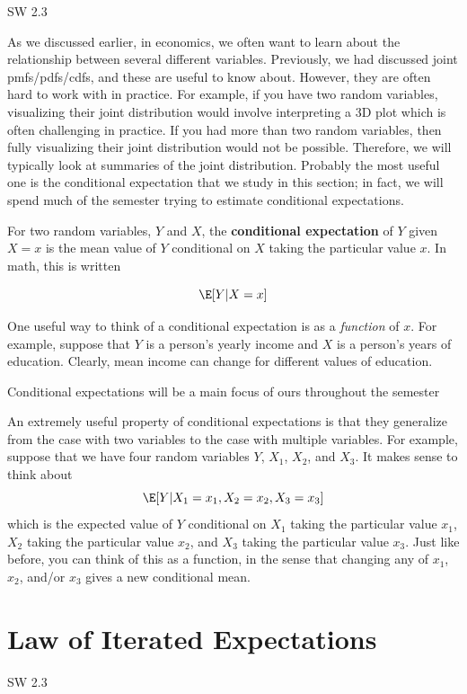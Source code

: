 \documentclass[
  letterpaper,
  DIV=11,
  numbers=noendperiod]{scrreprt}
\begin{document}
SW 2.3

As we discussed earlier, in economics, we often want to learn about the
relationship between several different variables. Previously, we had
discussed joint pmfs/pdfs/cdfs, and these are useful to know about.
However, they are often hard to work with in practice. For example, if
you have two random variables, visualizing their joint distribution
would involve interpreting a 3D plot which is often challenging in
practice. If you had more than two random variables, then fully
visualizing their joint distribution would not be possible. Therefore,
we will typically look at summaries of the joint distribution. Probably
the most useful one is the conditional expectation that we study in this
section; in fact, we will spend much of the semester trying to estimate
conditional expectations.

For two random variables, \(Y\) and \(X\), the \textbf{conditional
expectation} of \(Y\) given \(X=x\) is the mean value of \(Y\)
conditional on \(X\) taking the particular value \(x\). In math, this is
written

\[
  \E[Y|X=x]
\]

One useful way to think of a conditional expectation is as a
\emph{function} of \(x\). For example, suppose that \(Y\) is a person's
yearly income and \(X\) is a person's years of education. Clearly, mean
income can change for different values of education.

Conditional expectations will be a main focus of ours throughout the
semester

An extremely useful property of conditional expectations is that they
generalize from the case with two variables to the case with multiple
variables. For example, suppose that we have four random variables
\(Y\), \(X_1\), \(X_2\), and \(X_3\). It makes sense to think about \[
  \E[Y|X_1=x_1, X_2=x_2, X_3=x_3]
\] which is the expected value of \(Y\) conditional on \(X_1\) taking
the particular value \(x_1\), \(X_2\) taking the particular value
\(x_2\), and \(X_3\) taking the particular value \(x_3\). Just like
before, you can think of this as a function, in the sense that changing
any of \(x_1\), \(x_2\), and/or \(x_3\) gives a new conditional mean.

\section{Law of Iterated
Expectations}\label{law-of-iterated-expectations}

SW 2.3
\end{document}
